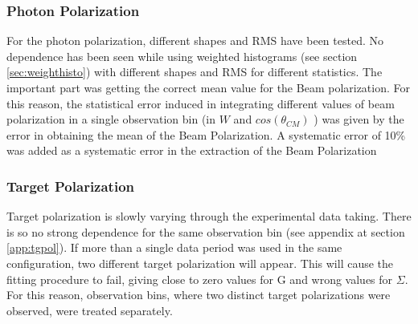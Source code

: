 \subsubsection{Photon Polarization}
For the photon polarization, different shapes and RMS have been tested. No dependence has been seen while using weighted histograms (see section \ref{sec:weighthisto}) with different shapes and RMS for different statistics. The important part was getting the correct mean value for the Beam polarization. For this reason, the statistical error induced in integrating different values of beam polarization in a single observation bin (in $W$ and $cos(\theta_{CM})$ ) was given by the error in obtaining the mean of the Beam Polarization. A systematic error of 10\% was added as a systematic error in the extraction of the Beam Polarization
\subsubsection{Target Polarization}
Target polarization is slowly varying through the experimental data taking. There is so no strong dependence for the same observation bin (see appendix at section \ref{app:tgpol}). If more than a single data period was used in the same configuration, two different target polarization will appear. This will cause the fitting procedure to fail, giving close to zero values for G and wrong values for $\Sigma$. For this reason, observation bins, where two distinct target polarizations were observed, were treated separately.   
